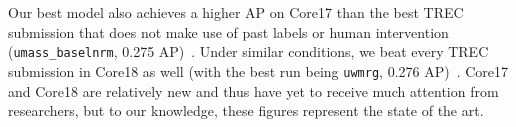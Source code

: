 Our best model also achieves a higher AP on Core17 than the best TREC submission that does not make use of past labels or human intervention (\texttt{umass\_baselnrm}, 0.275 AP)~\cite{core2017trec}.
Under similar conditions, we beat every TREC submission in Core18 as well (with the best run being \texttt{uwmrg}, 0.276 AP)~\cite{core2018trec}.
Core17 and Core18 are relatively new and thus have yet to receive much attention from researchers, but to our knowledge, these figures represent the state of the art.